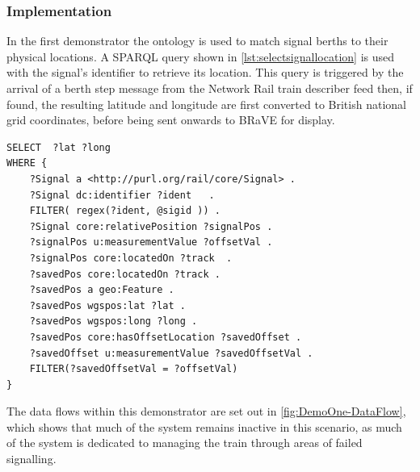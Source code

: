 \subsubsection{Implementation}
In the first demonstrator the ontology is used to match signal berths to their physical locations. A SPARQL query shown in \autoref{lst:selectsignallocation} is used with the signal's identifier to retrieve its location. This query is triggered by the arrival of a berth step message from the Network Rail train describer feed then, if found, the resulting latitude and longitude are first converted to British national grid coordinates, before being sent onwards to BRaVE for display. 

\begin{lstlisting}[float=h,language=sparql,frame=tb,caption={SPARQL to select a signal location from its identifier. Note some of the features here are Stardog specific, in particular the passing in of the @sigid parameter},label={lst:selectsignallocation}]
SELECT  ?lat ?long
WHERE {
    ?Signal a <http://purl.org/rail/core/Signal> .
    ?Signal dc:identifier ?ident   .
    FILTER( regex(?ident, @sigid )) .
    ?Signal core:relativePosition ?signalPos .
    ?signalPos u:measurementValue ?offsetVal .
    ?signalPos core:locatedOn ?track  .
    ?savedPos core:locatedOn ?track .
    ?savedPos a geo:Feature .
    ?savedPos wgspos:lat ?lat .
    ?savedPos wgspos:long ?long .   
    ?savedPos core:hasOffsetLocation ?savedOffset .
    ?savedOffset u:measurementValue ?savedOffsetVal .  
    FILTER(?savedOffsetVal = ?offsetVal)
}
\end{lstlisting}

\pagebreak

The data flows within this demonstrator are set out in \autoref{fig:DemoOne-DataFlow}, which shows that much of the system remains inactive in this scenario, as much of the system is dedicated to managing the train through areas of failed signalling.

